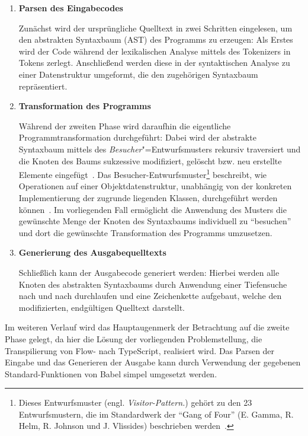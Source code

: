 \begin{enumerate}
  \item \textbf{Parsen des Eingabecodes}

    Zunächst wird der ursprüngliche Quelltext in zwei Schritten eingelesen, um den abstrakten Syntaxbaum (AST) des Programms zu erzeugen: Als Erstes wird der Code während der lexikalischen Analyse mittels des Tokenizers in Tokens zerlegt. Anschließend werden diese in der syntaktischen Analyse zu einer Datenstruktur umgeformt, die den zugehörigen Syntaxbaum repräsentiert.
    \\

  \item \textbf{Transformation des Programms}

    Während der zweiten Phase wird daraufhin die eigentliche Programmtransformation durchgeführt: Dabei wird der abstrakte Syntaxbaum mittels des \textit{Besucher}"=Entwurfsmusters rekursiv traversiert und die Knoten des Baums sukzessive modifiziert, gelöscht bzw. neu erstellte Elemente eingefügt~\autocite{BABEL_HANDBOOK}. Das Besucher-Entwurfsmuster\footnote{Dieses Entwurfsmuster (engl. \textit{Visitor-Pattern.}) gehört zu den 23 Entwurfsmustern, die im Standardwerk  der \enquote{Gang of Four} (E. Gamma, R. Helm, R. Johnson und J. Vlissides) beschrieben werden~\autocite[306\psqq]{GAMMA:1994}.} beschreibt, wie Operationen auf einer Objektdatenstruktur, unabhängig von der konkreten Implementierung der zugrunde liegenden Klassen, durchgeführt werden können~\autocite[634\psq]{Freeman:2004}. Im vorliegenden Fall ermöglicht die Anwendung des Musters die gewünschte Menge der Knoten des Syntaxbaums individuell zu \enquote{besuchen} und dort die gewünschte Transformation des Programms umzusetzen.
    \\

  \item \textbf{Generierung des Ausgabequelltexts}

    Schließlich kann der Ausgabecode generiert werden: Hierbei werden alle Knoten des abstrakten Syntaxbaums durch Anwendung einer Tiefensuche nach und nach durchlaufen und eine Zeichenkette aufgebaut, welche den modifizierten, endgültigen Quelltext darstellt.
\end{enumerate}

Im weiteren Verlauf wird das Hauptaugenmerk der Betrachtung auf die zweite Phase gelegt, da hier die Lösung der vorliegenden Problemstellung, die Transpilierung von Flow- nach TypeScript, realisiert wird. Das Parsen der Eingabe und das Generieren der Ausgabe kann durch Verwendung der gegebenen Standard-Funktionen von Babel simpel umgesetzt werden.

